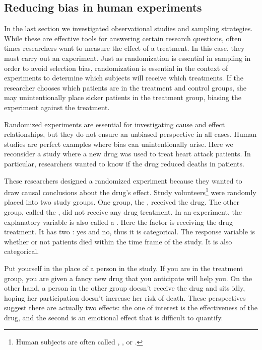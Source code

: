 \subsection{Reducing bias in human experiments}
\label{biasInHumanExperiments}

In the last section we investigated observational studies and sampling strategies. While these are effective tools for answering certain research questions, often times researchers want to measure the effect of a treatment. In this case, they must carry out an experiment. Just as randomization is essential in sampling in order to avoid selection bias, randomization is essential in the context of experiments to determine which subjects will receive which treatments. If the researcher chooses which patients are in the treatment and control groups, she may unintentionally place sicker patients in the treatment group, biasing the experiment against the treatment.

Randomized experiments are essential for investigating cause and effect relationships, but they do not ensure an unbiased perspective in all cases. Human studies are perfect examples where bias can unintentionally arise. Here we reconsider a study where a new drug was used to treat heart attack patients. In particular, researchers wanted to know if the drug reduced deaths in patients.

These researchers designed a randomized experiment because they wanted to draw causal conclusions about the drug's effect. Study volunteers\footnote{Human subjects are often called , , or .} were randomly placed into two study groups. One group, the , received the drug. The other group, called the , did not receive any drug treatment. In an experiment, the explanatory variable is also called a . Here the factor is receiving the drug treatment. It has two : yes and no, thus it is categorical. The response variable is whether or not patients died within the time frame of the study. It is also categorical.

Put yourself in the place of a person in the study. If you are in the treatment group, you are given a fancy new drug that you anticipate will help you. On the other hand, a person in the other group doesn't receive the drug and sits idly, hoping her participation doesn't increase her risk of death. These perspectives suggest there are actually two effects: the one of interest is the effectiveness of the drug, and the second is an emotional effect that is difficult to quantify.

